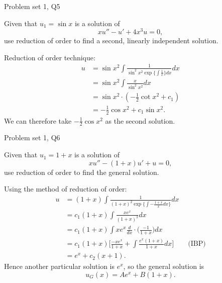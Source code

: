 \begin{problem}{Problem set 1, Q5}{}


    Given that $u_1 = \sin x$ is a solution of
        $$ xu'' - u' + 4x^3 u = 0 , $$
    use reduction of order to find a second, linearly independent solution.

    \tcblower

    Reduction of order technique:
        \begin{align*}
            u &= \sin x^2
                \int \frac{1}{\sin^2 x^2 \operatorname{exp}
                    \bigl\{ \int \frac{1}{x} \bigr\} dx } dx \\
            &= \sin x^2 \int \frac{x}{\sin^2 x^2} dx \\
            &= \sin x^2 \cdot (-\frac{1}{2} \cot x^2 + c_1) \\
            &= -\frac{1}{2} \cos x^2 + c_1 \sin x^2 .
        \end{align*}
    We can therefore take $-\frac{1}{2} \cos x^2$ as the second solution.

\end{problem}

\begin{problem}{Problem set 1, Q6}{}


    Given that $u_1 = 1 + x$ is a solution of
        $$ xu'' - (1 + x)u' + u = 0 , $$
    use reduction of order to find the general solution.

    \tcblower

    Using the method of reduction of order:
        \begin{align*}
            u &= (1 + x) \int \frac{1}{(1 + x)^2 \operatorname{exp}
                \bigl\{ \int -\frac{1+x}{x} dx \bigr\}} dx \\
            &= c_1 (1 + x) \int \frac{x e^x}{(1 + x)^2} dx \\
            &= c_1 (1 + x) \int x e^x \frac{d}{dx}
                \cdot \biggl( \frac{-1}{1 + x} \biggr) dx \\
            &= c_1 (1 + x) \biggl[ 
                \frac{-x e^x}{1 + x}
                + \int \frac{e^x (1 + x)}{1 + x} dx \biggr] 
                \qquad \text{(IBP)} \\
            &= e^x + c_2 (x + 1) .
        \end{align*}
    Hence another particular solution is $e^x$, so the general solution is
        $$ u_G(x) = Ae^x + B(1 + x) . $$

\end{problem}

